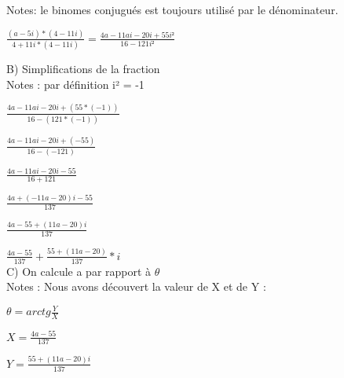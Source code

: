 Notes: le binomes conjugués est toujours utilisé par le dénominateur.

\vspace{5mm} %

$
\frac{(a-5i) *(4-11i)}{4+11i * (4-11i)} = \frac{4a-11ai-20i+55i²}{16-121i²}
$

\vspace{10mm} %

B) Simplifications de la fraction \\

Notes : par définition i² = -1

\vspace{5mm} %

$
\frac{4a-11ai-20i+(55*(-1))}{16-(121*(-1))}
$

\vspace{3mm} %

$
\frac{4a-11ai-20i+(-55)}{16-(-121)}
$
\vspace{3mm} %

$
\frac{4a-11ai-20i-55}{16+121}
$

\vspace{3mm} %

$
\frac{4a+(-11a-20)i-55}{137}
$

\vspace{3mm} %

$
\frac{4a-55+(11a-20)i}{137}
$
\vspace{3mm} %

$
\frac{4a-55}{137} + \frac{55+(11a-20)}{137}*i
$\\

\vspace{8mm} %
C) On calcule a par rapport à $\theta$ \\

Notes : Nous avons découvert la valeur de X et de Y : \\
\vspace{3mm} %

$
\theta = arctg{\frac{Y}{X}}
$
\vspace{5mm} %

$
X = \frac{4a-55}{137}
$
\vspace{5mm} %

$
Y= \frac{55+(11a-20)i}{137}
$
\vspace{5mm} %


